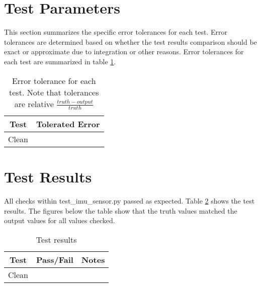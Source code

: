 \section{Test Parameters}
This section summarizes the specific error tolerances for each test. Error tolerances are determined based on whether the test results comparison should be exact or approximate due to integration or other reasons. Error tolerances for each test are summarized in table \ref{tab:errortol}. 

\begin{table}[H]
	\caption{Error tolerance for each test. Note that tolerances are relative $\frac{truth-output}{truth}$}
	\label{tab:errortol}
	\centering \fontsize{10}{10}\selectfont
	\begin{tabular}{ c | c } %
		\hline
		\textbf{Test}   									& \textbf{Tolerated Error} 						  \\ \hline
		Clean													& 		              \\ \hline
	\end{tabular}
\end{table}


\section{Test Results}
All checks within test\_imu\_sensor.py passed as expected. Table \ref{tab:results} shows the test results. The figures below the table show that the truth values matched the output values for all values checked.

\begin{table}[H]
	\caption{Test results}
	\label{tab:results}
	\centering \fontsize{10}{10}\selectfont
	\begin{tabular}{c | c | c  } %
		\hline
		\textbf{Test} 						  			   & \textbf{Pass/Fail} 						   			& \textbf{Notes} 									\\ \hline
		Clean	   				&               			& 			 \\ \hline
	\end{tabular}
\end{table}


 \label{fig:omegaWalkBoundPlot}


 \label{fig:accelWalkBoundPlot}

\pagebreak %